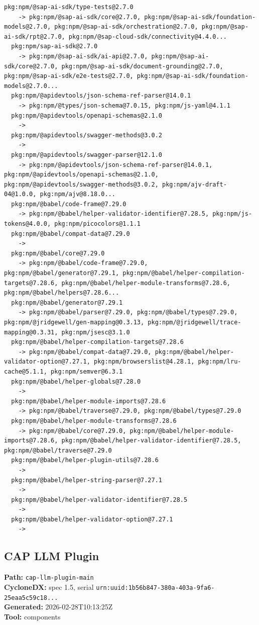 \documentclass[11pt,a4paper]{article}
\begin{document}
\begin{lstlisting}[style=depgraph]
  pkg:npm/@sap-ai-sdk/type-tests@2.7.0
    -> pkg:npm/@sap-ai-sdk/core@2.7.0, pkg:npm/@sap-ai-sdk/foundation-models@2.7.0, pkg:npm/@sap-ai-sdk/orchestration@2.7.0, pkg:npm/@sap-ai-sdk/rpt@2.7.0, pkg:npm/@sap-cloud-sdk/connectivity@4.4.0...
  pkg:npm/sap-ai-sdk@2.7.0
    -> pkg:npm/@sap-ai-sdk/ai-api@2.7.0, pkg:npm/@sap-ai-sdk/core@2.7.0, pkg:npm/@sap-ai-sdk/document-grounding@2.7.0, pkg:npm/@sap-ai-sdk/e2e-tests@2.7.0, pkg:npm/@sap-ai-sdk/foundation-models@2.7.0...
  pkg:npm/@apidevtools/json-schema-ref-parser@14.0.1
    -> pkg:npm/@types/json-schema@7.0.15, pkg:npm/js-yaml@4.1.1
  pkg:npm/@apidevtools/openapi-schemas@2.1.0
    -> 
  pkg:npm/@apidevtools/swagger-methods@3.0.2
    -> 
  pkg:npm/@apidevtools/swagger-parser@12.1.0
    -> pkg:npm/@apidevtools/json-schema-ref-parser@14.0.1, pkg:npm/@apidevtools/openapi-schemas@2.1.0, pkg:npm/@apidevtools/swagger-methods@3.0.2, pkg:npm/ajv-draft-04@1.0.0, pkg:npm/ajv@8.18.0...
  pkg:npm/@babel/code-frame@7.29.0
    -> pkg:npm/@babel/helper-validator-identifier@7.28.5, pkg:npm/js-tokens@4.0.0, pkg:npm/picocolors@1.1.1
  pkg:npm/@babel/compat-data@7.29.0
    -> 
  pkg:npm/@babel/core@7.29.0
    -> pkg:npm/@babel/code-frame@7.29.0, pkg:npm/@babel/generator@7.29.1, pkg:npm/@babel/helper-compilation-targets@7.28.6, pkg:npm/@babel/helper-module-transforms@7.28.6, pkg:npm/@babel/helpers@7.28.6...
  pkg:npm/@babel/generator@7.29.1
    -> pkg:npm/@babel/parser@7.29.0, pkg:npm/@babel/types@7.29.0, pkg:npm/@jridgewell/gen-mapping@0.3.13, pkg:npm/@jridgewell/trace-mapping@0.3.31, pkg:npm/jsesc@3.1.0
  pkg:npm/@babel/helper-compilation-targets@7.28.6
    -> pkg:npm/@babel/compat-data@7.29.0, pkg:npm/@babel/helper-validator-option@7.27.1, pkg:npm/browserslist@4.28.1, pkg:npm/lru-cache@5.1.1, pkg:npm/semver@6.3.1
  pkg:npm/@babel/helper-globals@7.28.0
    -> 
  pkg:npm/@babel/helper-module-imports@7.28.6
    -> pkg:npm/@babel/traverse@7.29.0, pkg:npm/@babel/types@7.29.0
  pkg:npm/@babel/helper-module-transforms@7.28.6
    -> pkg:npm/@babel/core@7.29.0, pkg:npm/@babel/helper-module-imports@7.28.6, pkg:npm/@babel/helper-validator-identifier@7.28.5, pkg:npm/@babel/traverse@7.29.0
  pkg:npm/@babel/helper-plugin-utils@7.28.6
    -> 
  pkg:npm/@babel/helper-string-parser@7.27.1
    -> 
  pkg:npm/@babel/helper-validator-identifier@7.28.5
    -> 
  pkg:npm/@babel/helper-validator-option@7.27.1
    -> 
\end{lstlisting}

\subsection{CAP LLM Plugin}
\textbf{Path:} \texttt{cap-llm-plugin-main}
\\ \textbf{CycloneDX:} spec 1.5, serial \texttt{urn:uuid:1b56b847-380a-403a-9fa6-25eaa5c59c18...}
\\ \textbf{Generated:} 2026-02-28T10:13:25Z
\\ \textbf{Tool:} components
\end{document}
